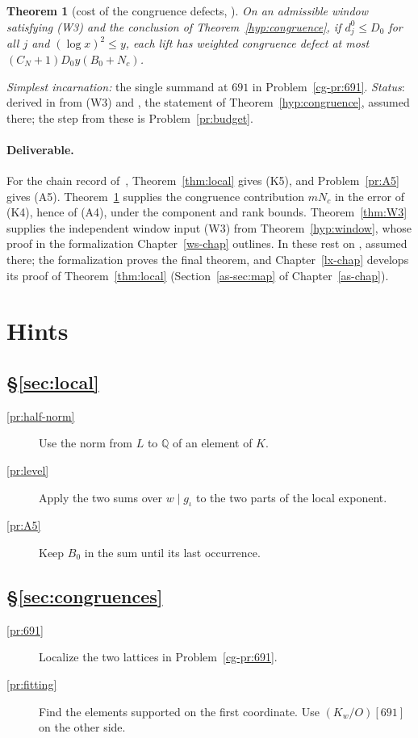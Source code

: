 \documentclass[reqno]{amsart}
\newcounter{chap}
\theoremstyle{definition}
\theoremstyle{plain}
\newtheorem{theorem}{Theorem}[section]
\newcommand{\Q}{\mathbb Q}
\begin{document}
\begin{theorem}[cost of the congruence defects, {\cite[Thm.~17.37]{Adr}}]\label{thm:congruence}
On an admissible window satisfying (W3) and the conclusion of Theorem~\ref{hyp:congruence}, if \(d_j^0\le D_0\) for all \(j\) and \((\log x)^2\le y\), each lift has weighted congruence defect at most \((C_N+1)D_0y(B_0+N_c)\).
\end{theorem}
\noindent\emph{Simplest incarnation:} the single summand at \(691\) in Problem~\ref{cg-pr:691}. \emph{Status}: derived in \cite[Thm.~17.37]{Adr} from (W3) and \cite[Hyp.~17.24]{Adr}, the statement of Theorem~\ref{hyp:congruence}, assumed there; the step from these is Problem~\ref{pr:budget}.

\paragraph{Deliverable.}\label{par:deliverable}
For the chain record of~\cite[Def.~18.9, Prop.~18.14]{Adr}, Theorem~\ref{thm:local} gives (K5), and Problem~\ref{pr:A5} gives (A5).  Theorem~\ref{thm:congruence} supplies the congruence contribution \(mN_c\) in the error of (K4), hence of (A4), under the component and rank bounds.  Theorem~\ref{thm:W3} supplies the independent window input (W3) from Theorem~\ref{hyp:window}, whose proof in the formalization Chapter~\ref{ws-chap} outlines.  In \cite{Adr} these rest on \cite[Hyps.~16.13, 16.14, 17.11, 17.24 and~17.36]{Adr}, assumed there; the formalization proves the final theorem, and Chapter~\ref{lx-chap} develops its proof of Theorem~\ref{thm:local} (Section~\ref{as-sec:map} of Chapter~\ref{as-chap}).

\section*{Hints}
\subsection*{\S\ref{sec:local}}
\begin{description}
\item[\ref{pr:half-norm}] Use the norm from \(L\) to \(\Q\) of an element of \(K\).
\item[\ref{pr:level}] Apply the two sums over \(w\mid g_\iota\) to the two parts of the local exponent.
\item[\ref{pr:A5}] Keep \(B_0\) in the sum until its last occurrence.
\end{description}
\subsection*{\S\ref{sec:congruences}}
\begin{description}
\item[\ref{pr:691}] Localize the two lattices in Problem~\ref{cg-pr:691}.
\item[\ref{pr:fitting}] Find the elements supported on the first coordinate.  Use \((K_w/O)[691]\) on the other side.
\end{description}
\end{document}
